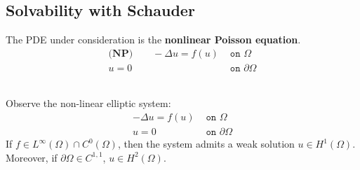 \subsection{Solvability with Schauder}
The PDE under consideration is the \textbf{nonlinear Poisson equation}.       
\begin{align*} 
\textbf{(NP)}\qquad
		- \Delta u = f(u) &\texttt{ on } \Omega\\
		u  = 0 &\texttt{ on } \partial \Omega 
\end{align*}           
\begin{theorem}
	Observe the non-linear elliptic system:
	\begin{align*}
		- \Delta u = f(u) &\texttt{ on } \Omega\\
		u  = 0 &\texttt{ on } \partial \Omega 
	\end{align*}
	If $f \in L^\infty(\Omega) \cap C^0(\Omega)$, then the system admits a weak solution $u \in H^1(\Omega)$. Moreover, if $\partial\Omega \in C^{1, 1}$, $u \in H^2(\Omega)$.
\end{theorem}
